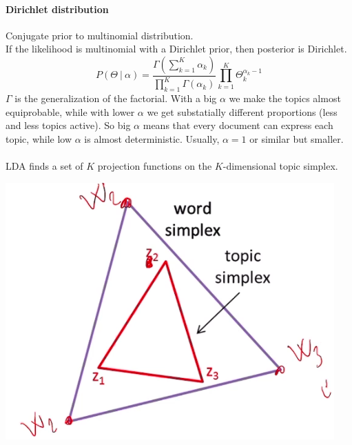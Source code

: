 \documentclass[10pt]{report}
\begin{document}
\paragraph{Dirichlet distribution} Conjugate prior to multinomial distribution.\\
If the likelihood is multinomial with a Dirichlet prior, then posterior is Dirichlet.
$$P(\Theta\:|\:\alpha) = \frac{\Gamma(\sum_{k=1}^K \alpha_k)}{\prod_{k=1}^K\Gamma(\alpha_k)}\prod_{k=1}^K\Theta_k^{\alpha_k-1}$$
$\Gamma$ is the generalization of the factorial. With a big $\alpha$ we make the topics almost equiprobable, while with lower $\alpha$ we get substatially different proportions (less and less topics active). So big $\alpha$ means that every document can express each topic, while low $\alpha$ is almost deterministic. Usually, $\alpha = 1$ or similar but smaller.\\\\
LDA finds a set of $K$ projection functions on the $K$-dimensional topic simplex.\begin{center}
	\includegraphics[scale=0.5]{41.png}
\end{center}
\end{document}
